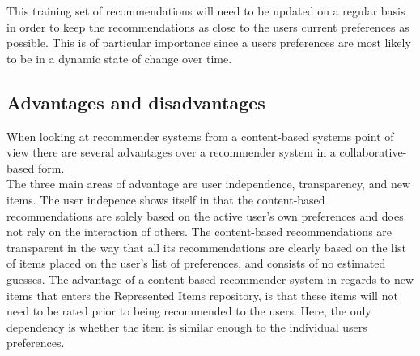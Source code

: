 This training set of recommendations will need to be updated on a regular basis in order to keep the recommendations as close to the users current preferences as possible. This is of particular importance since a users preferences are most likely to be in a dynamic state of change over time.



\subsection{Advantages and disadvantages}
When looking at recommender systems from a content-based systems point of view there are several advantages over a recommender system in a collaborative-based form.\\

The three main areas of advantage are user independence, transparency, and new items.
The user indepence shows itself in that the content-based recommendations are solely based on the active user’s own preferences and does not rely on the interaction of others.
The content-based recommendations are transparent in the way that all its recommendations are clearly based on the list of items placed on the user’s list of preferences, and consists of no estimated guesses. The advantage of a content-based recommender system in regards to new items that enters the Represented Items repository, is that these items will not need to be rated prior to being recommended to the users. Here, the only dependency is whether the item is similar enough to the individual users preferences.\\

